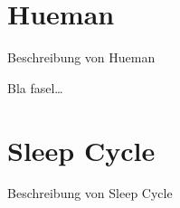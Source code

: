\section{Hueman}
\label{ch:Apps:sec:Hueman}

Beschreibung von Hueman

Bla fasel\ldots

\section{Sleep Cycle}
\label{ch:Apps:sec:SleepCycle}

Beschreibung von Sleep Cycle


